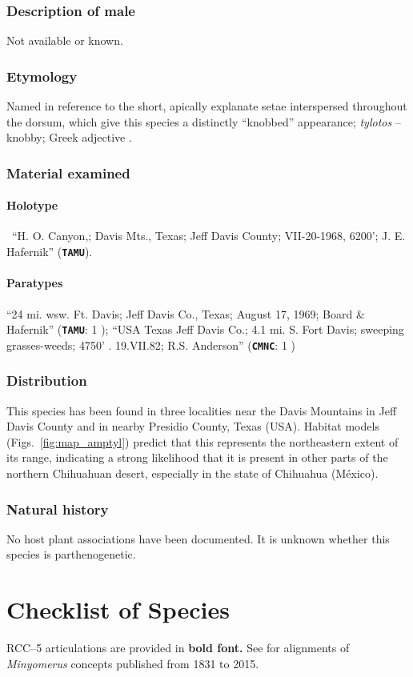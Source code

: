 \documentclass[fleqn,10pt,lineno]{wlpeerj} %
\begin{document}
		\subsubsection*{Description of male}
			Not available or known.
		\subsubsection*{Etymology}
			Named in reference to the short, apically explanate setae interspersed throughout the dorsum, which give this species a distinctly ``knobbed'' appearance; \textit{tylotos} -- knobby; Greek adjective \citep{brown1956}.
		\subsubsection*{Material examined}
			\paragraph{Holotype}
				\female~``H. O. Canyon,; Davis Mts., Texas; Jeff Davis County; VII-20-1968, 6200'; J. E. Hafernik'' (\texttt{\textbf{TAMU}}).
			\paragraph{Paratypes}
				``24 mi. wsw. Ft. Davis; Jeff Davis Co., Texas; August 17, 1969; Board \& Hafernik'' (\texttt{\textbf{TAMU}}: 1 \female);
				``USA Texas Jeff Davis Co.; 4.1 mi. S. Fort Davis; sweeping grasses-weeds; 4750' . 19.VII.82; R.S. Anderson'' (\texttt{\textbf{CMNC}}: 1 \female)
		\subsubsection*{Distribution}
			This species has been found in three localities near the Davis Mountains in Jeff Davis County and in nearby Presidio County, Texas (USA).
			Habitat models (Figs.~\ref{fig:map_amptyl}) predict that this represents the northeastern extent of its range, indicating a strong likelihood that it is present in other parts of the northern Chihuahuan desert, especially in the state of Chihuahua (M\'{e}xico).
		\subsubsection*{Natural history}
			No host plant associations have been documented.
			It is unknown whether this species is parthenogenetic.
	
\section*{Checklist of Species}\label{sec:checklist}
	RCC--5 articulations are provided in \textbf{bold font.} See \citet{jansen2015} for alignments of \textit{Minyomerus} concepts published from 1831 to 2015. 
	
\end{document}
